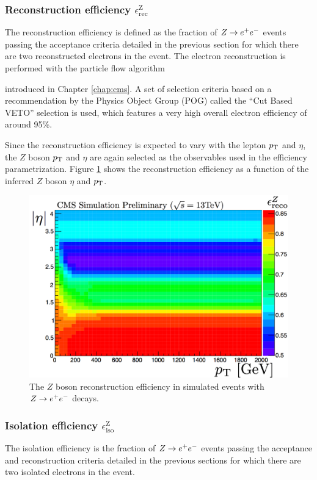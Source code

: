 \subsubsection{Reconstruction efficiency $\epsilon^{\text{Z}}_{\text{rec}}$}
The reconstruction efficiency is defined as the fraction of $Z\rightarrow e^+e^-$ events passing the acceptance criteria detailed in the previous section for which there are two reconstructed electrons in the event. The electron reconstruction is performed with the particle flow algorithm~{\cite{Beaudette:2014cea} introduced in Chapter \ref{chap:cms}. A set of selection criteria based on a recommendation by the Physics Object Group (POG) called the ``Cut Based VETO'' selection \cite{bib:ElectronID} is used, which features a very high overall electron efficiency of around 95\%. 

Since the reconstruction efficiency is expected to vary with the lepton $p_{\text{T}}$ and $\eta$, the $Z$ boson $p_{\text{T}}$ and $\eta$ are again selected as the observables used in the efficiency parametrization. Figure \ref{fig:ZeeReconstruction} shows the reconstruction efficiency as a function of the inferred $Z$ boson $\eta$ and $p_{\text{T}}$. 
\begin{figure}[tb!]
\centering
\includegraphics[width=0.7\linewidth]{figures/SusySearches/HadStop2015/ZeeReconstruction.png}
\caption{The $Z$ boson reconstruction efficiency in simulated events with $Z\rightarrow e^+e^-$ decays.}
\label{fig:ZeeReconstruction}
\end{figure}
\FloatBarrier

\subsubsection{Isolation efficiency $\epsilon^{\text{Z}}_{\text{iso}}$}
The isolation efficiency is the fraction of $Z\rightarrow e^+e^-$ events passing the acceptance and reconstruction criteria detailed in the previous sections for which there are two isolated electrons in the event. 

}
